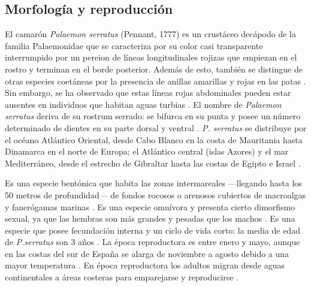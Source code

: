\documentclass[a4paper]{article}
\begin{document}
\subsection{Morfología y reproducción}
El camarón \textit{Palaemon serratus} (Pennant, 1777) es un crustáceo decápodo de la familia Palaemonidae que se caracteriza por su color casi transparente interrumpido por un pereion de líneas longitudinales rojizas que empiezan en el rostro y terminan en el borde posterior. Además de esto, también se distingue de otras especies coetáneas por la presencia de anillas amarillas y rojas en las patas \citep{Zariquiey1968}. Sin embargo, se ha observado que estas líneas rojas abdominales pueden estar ausentes en individuos que habitan aguas turbias \citep{Gonzalez2006}. El nombre de \textit{Palaemon serratus} deriva de su rostrum serrado: se bifurca en su punta y posee un número determinado de dientes en su parte dorsal y ventral \citep{Gonzalez2006}. \textit{P. serratus} se distribuye por el océano Atlántico Oriental, desde Cabo Blanco en la costa de Mauritania hasta Dinamarca en el norte de Europa; el Atlántico central (islas Azores) y el mar Mediterráneo, desde el estrecho de Gibraltar hasta las costas de Egipto e Israel \citep{Zariquiey1968, Felicio2002}.\par Es una especie bentónica que habita las zonas intermareales ---llegando hasta los 50 metros de profundidad--- de fondos rocosos o arenosos cubiertos de macroalgas y fanerógamas marinas \citep{Felicio2002}. Es una especie omnívora \citep{Forster1951} y presenta cierto dimorfismo sexual, ya que las hembras son más grandes y pesadas que los machos \citep{Guerao1995}. Es una especie que posee fecundación interna y un ciclo de vida corto: la media de edad de \textit{P.serratus} son 3 años \citep{Felicio2002}. La época reproductora es entre enero y mayo, aunque en las costas del sur de España se alarga de noviembre a agosto debido a una mayor temperatura \citep{Rodriguez1981, Figueras1986, Felicio2002}. En época reproductora los adultos migran desde aguas continentales a áreas costeras para emparejarse y reproducirse \citep{Gonzalez2014}.
\end{document}
